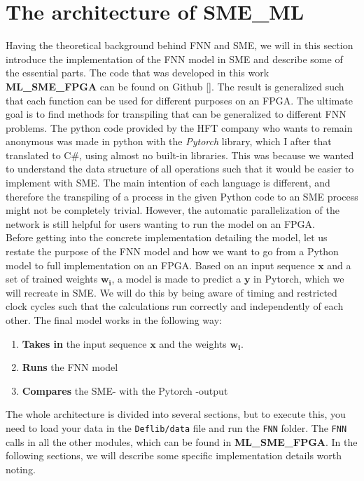 \section{The architecture of SME\_ML}%
\label{sec:SME_ML}
Having the theoretical background behind FNN and SME, we will in this section introduce the implementation of the FNN model in SME and describe some of the essential parts.
The code that was developed in this work \textbf{ML\_SME\_FPGA} can be found on Github [\cite{Github}]. The result is generalized such that each function can be used for different purposes on an FPGA.  
The ultimate goal is to find methods for transpiling that
can be generalized to different FNN problems.
The python code provided by the HFT company who wants to remain anonymous was made in python with the \emph{Pytorch} library, which I after that translated to C\#, using almost no built-in libraries. This was because we wanted to understand the data structure of all operations such that it would be easier to implement with SME.
The main intention of each language is different, and therefore the transpiling of a process in the given Python code to an SME process might not be completely trivial. However, the automatic parallelization of the network is still helpful for users wanting to run the model on an FPGA.
\\

Before getting into the concrete implementation detailing the model, let us restate the purpose of the FNN model and how we want to go from a Python model to full implementation on an FPGA.
Based on an input sequence $\mathbf{x}$ and a set of trained weights $\mathbf{w_i}$, a model is made to predict a $\mathbf{y}$ in Pytorch, which we will recreate in SME. We will do this by being aware of timing and restricted clock cycles such that the calculations run correctly and independently of each other. The final model works in the following way:

\begin{enumerate}
    \item \textbf{Takes in} the input sequence $\mathbf{x}$ and the weights $\mathbf{w_i}$. 
    \item \textbf{Runs} the FNN model
    \item \textbf{Compares} the SME- with the Pytorch -output
\end{enumerate}
The whole architecture is divided into several sections, but to execute this, you need to load your data in the \texttt{Deflib/data} file and run the \texttt{FNN} folder. The \texttt{FNN} calls in all the other modules, which can be found in \textbf{ML\_SME\_FPGA}. In the following sections, we will describe some specific implementation details worth noting. \\


